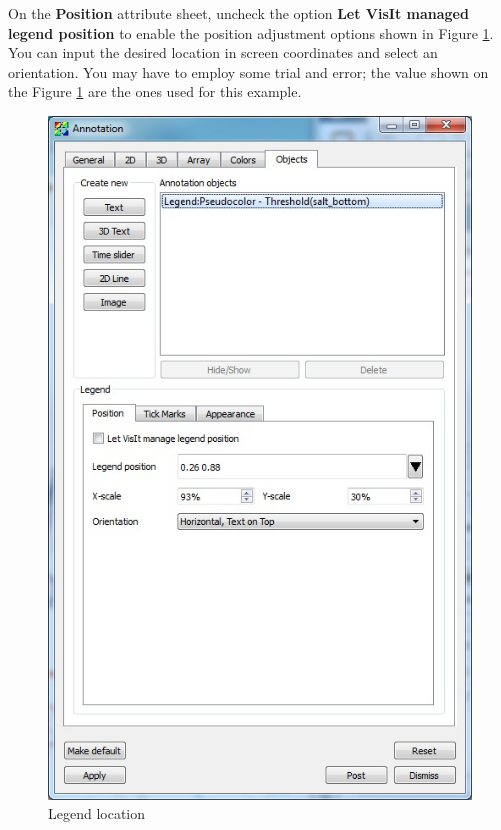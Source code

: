 \documentclass[12pt]{report}
\begin{document}
On the {\bf Position} attribute sheet, uncheck the option {\bf Let VisIt managed legend position} to enable
the position adjustment options shown in Figure \ref{figure:legendAttrPos}. You can input the desired
location in screen coordinates and select an orientation. You may have to employ some trial and error; 
the value shown on the Figure \ref{figure:legendAttrPos} are the ones used for this example. 

	      \begin{figure}
        \begin{center}
        \includegraphics{legendAttrPos}
        \caption{Legend location}
        \label{figure:legendAttrPos}
        \end{center}
        \end{figure}
				
\end{document}
